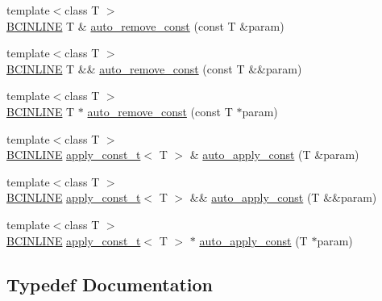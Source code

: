 \begin{DoxyCompactItemize}
\item 
{\footnotesize template$<$class T $>$ }\\\hyperlink{BlackCat__Common_8h_a6699e8b0449da5c0fafb878e59c1d4b1}{B\+C\+I\+N\+L\+I\+NE} T \& \hyperlink{namespaceBC_1_1meta_a96991224f4477abc35cc30a1000b6c66}{auto\+\_\+remove\+\_\+const} (const T \&param)
\item 
{\footnotesize template$<$class T $>$ }\\\hyperlink{BlackCat__Common_8h_a6699e8b0449da5c0fafb878e59c1d4b1}{B\+C\+I\+N\+L\+I\+NE} T \&\& \hyperlink{namespaceBC_1_1meta_a6b3668aeb8c93e6c340478f3619f6367}{auto\+\_\+remove\+\_\+const} (const T \&\&param)
\item 
{\footnotesize template$<$class T $>$ }\\\hyperlink{BlackCat__Common_8h_a6699e8b0449da5c0fafb878e59c1d4b1}{B\+C\+I\+N\+L\+I\+NE} T $\ast$ \hyperlink{namespaceBC_1_1meta_aae782a0a73138dc656a65a324bd2d9c9}{auto\+\_\+remove\+\_\+const} (const T $\ast$param)
\item 
{\footnotesize template$<$class T $>$ }\\\hyperlink{BlackCat__Common_8h_a6699e8b0449da5c0fafb878e59c1d4b1}{B\+C\+I\+N\+L\+I\+NE} \hyperlink{namespaceBC_1_1meta_a210dff319dbb0dd2a60fcfdda5779ace}{apply\+\_\+const\+\_\+t}$<$ T $>$ \& \hyperlink{namespaceBC_1_1meta_afba0a9ceec97b810386a063f6e1fda97}{auto\+\_\+apply\+\_\+const} (T \&param)
\item 
{\footnotesize template$<$class T $>$ }\\\hyperlink{BlackCat__Common_8h_a6699e8b0449da5c0fafb878e59c1d4b1}{B\+C\+I\+N\+L\+I\+NE} \hyperlink{namespaceBC_1_1meta_a210dff319dbb0dd2a60fcfdda5779ace}{apply\+\_\+const\+\_\+t}$<$ T $>$ \&\& \hyperlink{namespaceBC_1_1meta_aaa02a4eb08a709096b0c03f2b55ff947}{auto\+\_\+apply\+\_\+const} (T \&\&param)
\item 
{\footnotesize template$<$class T $>$ }\\\hyperlink{BlackCat__Common_8h_a6699e8b0449da5c0fafb878e59c1d4b1}{B\+C\+I\+N\+L\+I\+NE} \hyperlink{namespaceBC_1_1meta_a210dff319dbb0dd2a60fcfdda5779ace}{apply\+\_\+const\+\_\+t}$<$ T $>$ $\ast$ \hyperlink{namespaceBC_1_1meta_a6db0beb406c49e8ef4c05c7430baa609}{auto\+\_\+apply\+\_\+const} (T $\ast$param)
\end{DoxyCompactItemize}


\subsection{Typedef Documentation}
